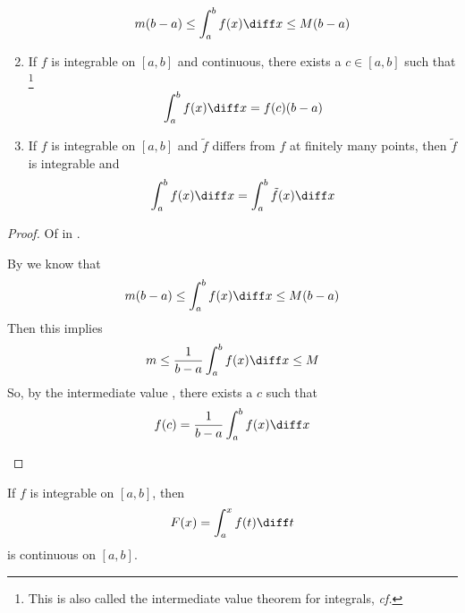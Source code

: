 \begin{thm}
\begin{enumerate}
		      \begin{equation}\label{eq-definite-integral-bounded}
			      m(b-a) \leq \int_a^b f(x) \diff x \leq M(b-a)
		      \end{equation}
		\item If $f$ is integrable on $[a,b]$ and continuous, there exists a $c\in[a,b]$ such that
		      \footnote{This is also called the intermediate value theorem for integrals, \textit{cf.} }
		      \begin{equation}\label{eq-intermediate-value-theorem-for-theorems}
			      \int_a^b f(x) \diff x = f(c)(b-a)
		      \end{equation}
		\item If $f$ is integrable on $[a,b]$ and $\tilde{f}$ differs from $f$ at finitely many points, then $\tilde{f}$ is integrable and
		      \begin{equation}\label{eq-change-points-retain-integral}
			      \int_a^b f(x) \diff x =  \int_a^b \tilde{f}(x) \diff x
		      \end{equation}
	\end{enumerate}
\end{thm}

\begin{proof}
	Of  in .
	\begin{flushleft}
		By  we know that
		\begin{equation*}
			m(b-a) \leq \int_a^b f(x) \diff x \leq M(b-a)
		\end{equation*}
		Then this implies
		\begin{align*}
			m \leq \frac{1}{b-a}\int_a^b f(x) \diff x \leq M
		\end{align*}
		So, by the intermediate value ,
		there exists a $c$ such that
		\begin{equation*}
			f(c) =  \frac{1}{b-a}\int_a^b f(x) \diff x
		\end{equation*}
	\end{flushleft}
\end{proof}

\begin{thm}\label{thm-integrable-continuous}
	If $f$ is integrable on $[a,b]$, then
	\begin{equation}
		F(x) = \int_a^x f(t) \diff t
	\end{equation}
	is continuous on $[a,b]$.
\end{thm}

